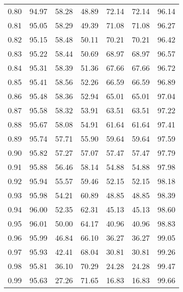 \begin{tabular}{|c|c|c|c|c|c|c|}
      0.80 &     94.97 &     58.28 &      48.89 &   72.14 &      72.14 &         96.14 \\
      0.81 &     95.05 &     58.29 &      49.39 &   71.08 &      71.08 &         96.27 \\
      0.82 &     95.15 &     58.48 &      50.11 &   70.21 &      70.21 &         96.42 \\
      0.83 &     95.22 &     58.44 &      50.69 &   68.97 &      68.97 &         96.57 \\
      0.84 &     95.31 &     58.39 &      51.36 &   67.66 &      67.66 &         96.72 \\
      0.85 &     95.41 &     58.56 &      52.26 &   66.59 &      66.59 &         96.89 \\
      0.86 &     95.48 &     58.36 &      52.94 &   65.01 &      65.01 &         97.04 \\
      0.87 &     95.58 &     58.32 &      53.91 &   63.51 &      63.51 &         97.22 \\
      0.88 &     95.67 &     58.08 &      54.91 &   61.64 &      61.64 &         97.41 \\
      0.89 &     95.74 &     57.71 &      55.90 &   59.64 &      59.64 &         97.59 \\
      0.90 &     95.82 &     57.27 &      57.07 &   57.47 &      57.47 &         97.79 \\
      0.91 &     95.88 &     56.46 &      58.14 &   54.88 &      54.88 &         97.98 \\
      0.92 &     95.94 &     55.57 &      59.46 &   52.15 &      52.15 &         98.18 \\
      0.93 &     95.98 &     54.21 &      60.89 &   48.85 &      48.85 &         98.39 \\
      0.94 &     96.00 &     52.35 &      62.31 &   45.13 &      45.13 &         98.60 \\
      0.95 &     96.01 &     50.00 &      64.17 &   40.96 &      40.96 &         98.83 \\
      0.96 &     95.99 &     46.84 &      66.10 &   36.27 &      36.27 &         99.05 \\
      0.97 &     95.93 &     42.41 &      68.04 &   30.81 &      30.81 &         99.26 \\
      0.98 &     95.81 &     36.10 &      70.29 &   24.28 &      24.28 &         99.47 \\
      0.99 &     95.63 &     27.26 &      71.65 &   16.83 &      16.83 &         99.66 \\
\bottomrule
\end{tabular}
